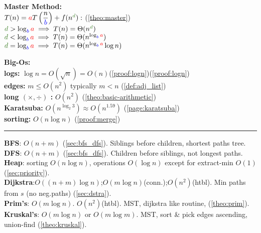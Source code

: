\begin{minipage}{0.45\textwidth}
\textbf{Master Method:}\\

\vspace{-.5em}
\noindent
$T(n) = \textcolor{red}{a}T\left(\dfrac{n}{\textcolor{blue}{b}}\right) + f(n^{\textcolor{OliveGreen}{d}}):$ (\ref{theo:master})\\
$\textcolor{OliveGreen}{d} > \log_{\textcolor{blue}{b}} \textcolor{red}{a} \implies T(n) = \Theta(n^{\textcolor{OliveGreen}{d}})$\\
$\textcolor{OliveGreen}{d} < \log_{\textcolor{blue}{b}} \textcolor{red}{a} \implies T(n) = \Theta(n^{\log_{\textcolor{blue}{b}} \textcolor{red}{a}})$\\
$\textcolor{OliveGreen}{d} = \log_{\textcolor{blue}{b}} \textcolor{red}{a} \implies T(n) = \Theta(n^{\log_{\textcolor{blue}{b}} \textcolor{red}{a}} \log n)$\\
\end{minipage}
\hfill
\begin{minipage}{0.45\textwidth}
\textbf{Big-Os:}\\
\textbf{logs:} $\log n = O(\sqrt{n}) = O(n)$(\ref{proof:logn})(\ref{proof:logn})\\
\textbf{edges:} $m \leq O(n^2)$ typically $m<n$ (\ref{def:adj_list})\\
\textbf{long $(\times,\div)$ :} $O(n^2)$ (\ref{theo:basic-arithmetic})\\
\textbf{Karatsuba:} $O(n^{\log_2 3})\approx O(n^{1.59})$ (\ref{page:karatsuba})\\
\textbf{sorting:} $O(n\log n)$ (\ref{proof:merge})\\
\end{minipage}
\noindent\rule{\textwidth}{0.4pt}
\textbf{BFS}: $O(n+m)$ (\ref{sec:bfs_dfs}). Siblings before children, shortest paths tree.\\
\textbf{DFS}: $O(n+m)$ (\ref{sec:bfs_dfs}). Children before siblings, not longest paths.\\
\textbf{Heap}: sorting $O(n\log n)$, operations $O(\log n)$ except for extract-min $O(1)$ (\ref{sec:priority}).\\
\textbf{Dijkstra}:$O((n+m)\log n)$;$O(m \log n)$(conn.);$O(n^2)$(htbl). Min paths from $s$ (no neg.paths) (\ref{sec:dstra}).\\
\textbf{Prim's}: $O(m\log n)$. $O(n^2)$(htbl). MST, dijkstra like routine, (\ref{theo:prim}).\\
\textbf{Kruskal's}: $O(m \log n)$ or $O(m \log m)$. MST, sort \& pick edges ascending, union-find (\ref{theo:kruskal}).\\
